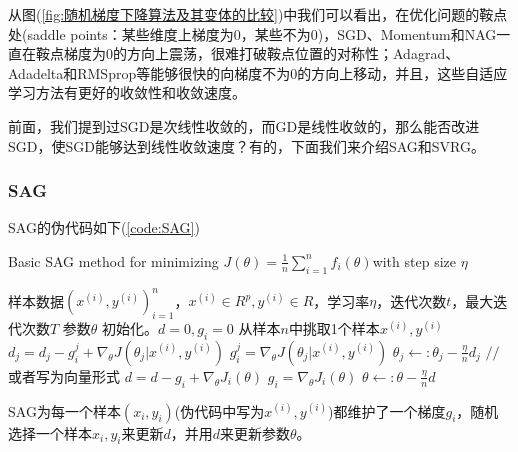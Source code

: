         从图(\ref{fig:随机梯度下降算法及其变体的比较})中我们可以看出，在优化问题的鞍点处(saddle points：某些维度上梯度为0，某些不为0)，SGD、Momentum和NAG一直在鞍点梯度为0的方向上震荡，很难打破鞍点位置的对称性；Adagrad、Adadelta和RMSprop等能够很快的向梯度不为0的方向上移动，并且，这些自适应学习方法有更好的收敛性和收敛速度。
        \par
        前面，我们提到过SGD是次线性收敛的，而GD是线性收敛的，那么能否改进SGD，使SGD能够达到线性收敛速度？有的，下面我们来介绍SAG和SVRG。
        \subsubsection{SAG}
            \par
            SAG的伪代码如下(\ref{code:SAG})
            \begin{algorithm}[h]
                \caption{Basic SAG method for minimizing $J(\theta) = \frac 1n \sum_{i = 1}^nf_i(\theta)$with step size $\eta$}\label{code:SAG}
                \begin{algorithmic}[1]
                    \Require 样本数据$(x^{(i)},y^{(i)})_{i=1}^n$，$x^{(i)}\in R^p,y^{(i)}\in R$，学习率$\eta$，迭代次数$t$，最大迭代次数$T$
                    \Ensure 参数$\theta$
                    \State 初始化。$d= 0,g_i = 0$
                      \State 从样本$n$中挑取1个样本$x^{(i)},y^{(i)}$
                        \State $d_j = d_j - g_i^j + \nabla _\theta J(\theta_j|x^{(i)},y^{(i)})$
                        \State $g_i^j = \nabla _\theta J(\theta_j|x^{(i)},y^{(i)})$
                        \State $\theta_j \leftarrow:\theta_j - \frac{\eta}{n} d_j$
                      \EndFor
                      \State $//$ 或者写为向量形式
                      \State $d = d - g_i + \nabla _\theta J_i(\theta)$
                      \State $g_i = \nabla_\theta J_i(\theta)$
                      \State $\theta \leftarrow :\theta - \frac{\eta}{n}d$
                    \EndFor
                \end{algorithmic}
            \end{algorithm}
            \par
            SAG为每一个样本$(x_i,y_i)$(伪代码中写为$x^{(i)},y^{(i)}$)都维护了一个梯度$g_i$，随机选择一个样本$x_i,y_i$来更新$d$，并用$d$来更新参数$\theta$。
